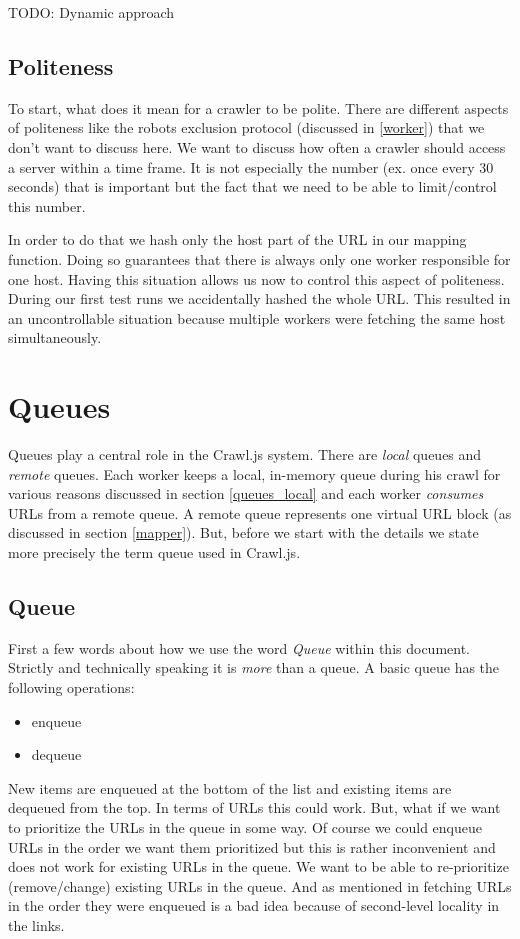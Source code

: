 TODO: Dynamic approach

\subsection{Politeness}
To start, what does it mean for a crawler to be polite. There are different aspects of politeness like the robots exclusion protocol (discussed in \ref{worker}) that we don't want to discuss here. We want to discuss how often a crawler should access a server within a time frame. It is not especially the number (ex. once every 30 seconds) that is important but the fact that we need to be able to limit/control this number.

In order to do that we hash only the host part of the URL in our mapping function. Doing so guarantees that there is always only one worker responsible for one host. Having this situation allows us now to control this aspect of politeness.
During our first test runs we accidentally hashed the whole URL. This resulted in an uncontrollable situation because multiple workers were fetching the same host simultaneously.

\section{Queues}
Queues play a central role in the Crawl.js system. There are \emph{local} queues and \emph{remote} queues. Each worker keeps a local, in-memory queue during his crawl for various reasons discussed in section \ref{queues_local} and each worker \emph{consumes} URLs from a remote queue. A remote queue represents one virtual URL block (as discussed in section \ref{mapper}). But, before we start with the details we state more precisely the term queue used in Crawl.js.

\subsection{Queue}
First a few words about how we use the word \emph{Queue} within this document. Strictly and technically speaking it is \emph{more} than a queue. A basic queue has the following operations:
\begin{itemize}
  \item enqueue
  \item dequeue
\end{itemize}

New items are enqueued at the bottom of the list and existing items are dequeued from the top. In terms of URLs this could work. But, what if we want to prioritize the URLs in the queue in some way. Of course we could enqueue URLs in the order we want them prioritized but this is rather inconvenient and does not work for existing URLs in the queue. We want to be able to re-prioritize (remove/change) existing URLs in the queue. And as mentioned in \cite{hp_crawler} fetching URLs in the order they were enqueued is a bad idea because of second-level locality in the links.


